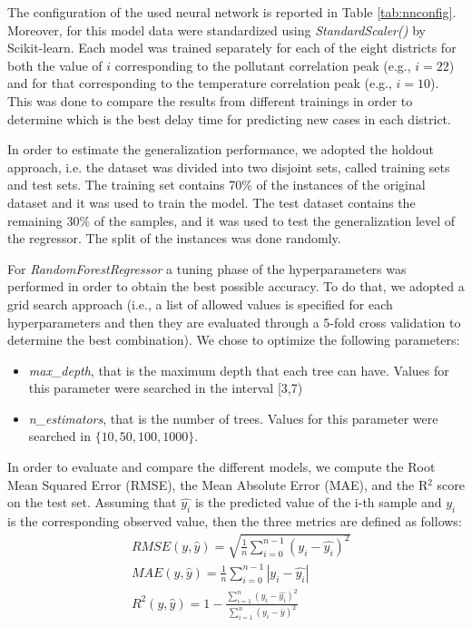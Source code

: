 \documentclass[review]{elsarticle}
\begin{document}
The configuration of the used neural network is reported in Table \ref{tab:nnconfig}. Moreover, for this model data were standardized using \textit{StandardScaler()} by Scikit-learn. 
Each model was trained separately for each of the eight districts for both the value of $i$ corresponding to the pollutant correlation peak (e.g., $i=22$) and for that corresponding to the temperature correlation peak (e.g., $i=10$). This was done to compare the results from different trainings in order to determine which is the best delay time for predicting new cases in each district.

In order to estimate the generalization performance, we adopted the holdout approach, i.e. the dataset was divided into two disjoint sets, called training sets and test sets. The training set contains 70\% of the instances of the original dataset and it was used to train the model. The test dataset contains the remaining 30\% of the samples, and it was used to test the generalization level of the regressor. The split of the instances was done randomly.

For \textit{RandomForestRegressor} a tuning phase of the hyperparameters was performed in order to obtain the best possible accuracy. To do that, we adopted a grid search approach %
(i.e., a list of allowed values is specified for each hyperparameters and then they are evaluated through a 5-fold cross validation to determine the best combination). %
We chose to optimize the following parameters: 

\begin{itemize} 
    \item \textit{max\_depth}, that is the maximum depth that each tree can have. Values for this parameter were searched in the interval [3,7)
    \item \textit{n\_estimators}, that is the number of trees. Values for this parameter were searched in $\{10, 50, 100, 1000\}$.
\end{itemize}

In order to evaluate and compare the different models, we compute the Root Mean Squared Error (RMSE), the Mean Absolute Error (MAE), and the R$^{2}$ score on the test set. 
Assuming that $\hat{y_{i}}$ is the predicted value of the i-th sample and $y_{i}$ is the corresponding observed value, then the three metrics are defined as follows:
\begin{align*}
	& RMSE(y,\hat{y}) = \sqrt{\frac{1}{n}\sum_{i=0}^{n-1} (y_{i}-\hat{y_{i}})^2}
	\\
	& MAE(y,\hat{y}) = \frac{1}{n}\sum_{i=0}^{n-1} |y_{i}-\hat{y_{i}}|
	\\
	& R^2(y,\hat{y}) = 1- \frac{\sum_{i=1}^{n} (y_{i}-\hat{y_{i}})^2}{\sum_{i=1}^{n} (y_{i}-\bar{y})^2}
\end{align*}
\end{document}
